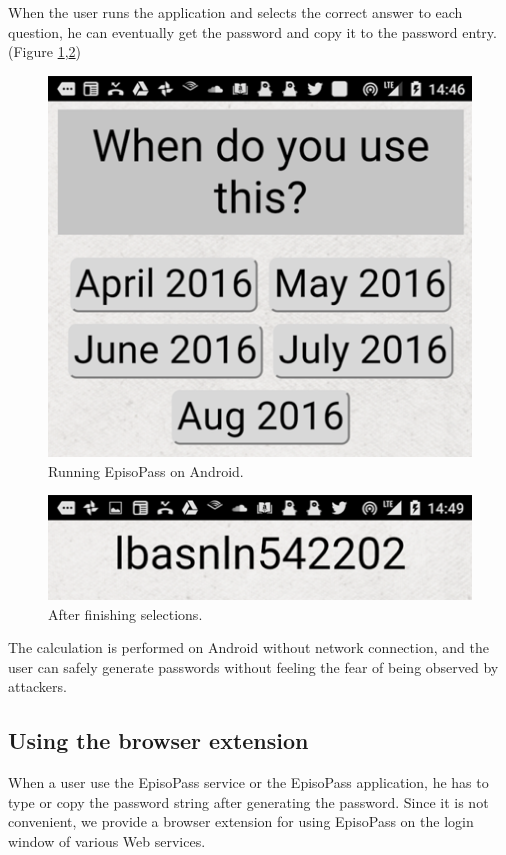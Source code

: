 \documentclass[runningheads,a4paper]{llncs}
\begin{document}
When the user runs the application and selects the correct answer
to each question, he can eventually get the password and copy it to the password entry.
(Figure \ref{android1},\ref{android2})

\begin{figure}[H]
\centering
\includegraphics[width=0.7\columnwidth]{figures/429eec261024dc6c85351f51c12f09b4}
\caption{Running EpisoPass on Android.}
\label{android1}
\end{figure}

\begin{figure}[H]
\centering
\includegraphics[width=0.7\columnwidth]{figures/ba8f5aeaa935ad63437969f4d746746b}
\caption{After finishing selections.}
\label{android2}
\end{figure}

The calculation is performed on Android without network connection,
and the user can safely generate passwords 
without feeling the fear of being observed by attackers.

\subsection{Using the browser extension}
\label{extensionsection}

When a user use the EpisoPass service or the EpisoPass application,
he has to type or copy the password string after generating the password.
Since it is not convenient,
we provide a browser extension for using EpisoPass on the login window of
various Web services.
\end{document}
